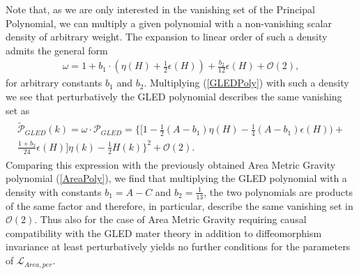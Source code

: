 \documentclass[a4paper,12pt, DIV=14, BCOR=5mm, twoside, headsepline, numbers=noenddot]{scrbook}
\begin{document}
Note that, as we are only interested in the vanishing set of the Principal Polynomial, we can multiply a given polynomial with a non-vanishing scalar density of arbitrary weight. The expansion to linear order of such a density admits the general form
\begin{align}\label{dens}
\omega = 1+ b_1 \cdot (\eta(H) + \frac{1}{2} \epsilon(H)) + \frac{b_2}{12}\epsilon(H) + \mathcal{O}(2),
\end{align}
for arbitrary constants $b_1$ and $b_2$.
Multiplying  (\ref{GLEDPoly}) with such a density we see that perturbatively the GLED polynomial describes the same vanishing set as 
\begin{align} \label{GLEDPoly2}
\begin{aligned}
    \widetilde{\mathcal{P}}_{GLED}(k) = \omega \cdot \mathcal{P}_{GLED} = 
    \bigl\{  \bigl[ 1 - \frac{1}{2} (A-b_1) \eta(H) - \frac{1}{4} (A-b_1) \epsilon(H)) + \\ \frac{1+b_2}{24} \epsilon(H) \bigr] \eta(k)
    -\frac{1}{2} H(k)       \bigr\}^2 + \mathcal{O}(2).
\end{aligned}
\end{align}
Comparing this expression with the previously obtained Area Metric Gravity polynomial (\ref{AreaPoly}), we find that multiplying the GLED polynomial with a density with constants $b_1 = A -C$ and $b_2 = \frac{1}{13}$, the two polynomials are products of the same factor and therefore, in particular, describe the same vanishing set in $\mathcal{O}(2)$. Thus also for the case of Area Metric Gravity requiring causal compatibility with the GLED mater theory in addition to diffeomorphism invariance at least perturbatively yields no further conditions for the parameters of $\mathcal{L}_{Area,per}$.
\end{document}
